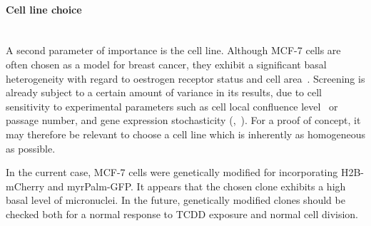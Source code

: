 \paragraph*{Cell line choice}~\\
A second parameter of importance is the cell line. Although MCF-7 cells are often chosen as a model for breast cancer, they exhibit a significant basal heterogeneity with regard to oestrogen receptor status and cell area~\cite{pmid11153613}. Screening is already subject to a certain amount of variance in its results, due to cell sensitivity to experimental parameters such as cell local confluence level~\cite{pmid19710653} or passage number, and gene expression stochasticity (\cite{pmid12183631},~\cite{pmid18957198}). For a proof of concept, it may therefore be relevant to choose a cell line which is inherently as homogeneous as possible.

In the current case, MCF-7 cells were genetically modified for incorporating H2B-mCherry and myrPalm-GFP. It appears that the chosen clone exhibits a high basal level of micronuclei. In the future, genetically modified clones should be checked both for a normal response to TCDD exposure and normal cell division.


%

%
